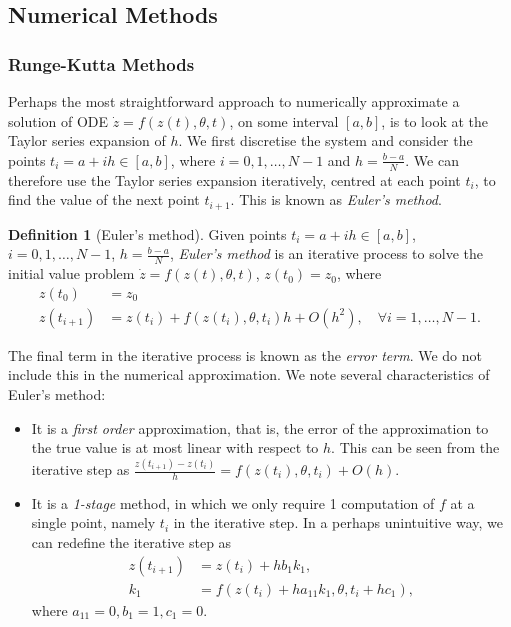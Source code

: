 \documentclass[a4paper,11pt,titlepage]{article}
\theoremstyle{definition}
\newtheorem{definition}{Definition}[section]
\theoremstyle{plain}
\theoremstyle{remark}
\begin{document}
\subsection{Numerical Methods}
\label{sec:nummethods}

\subsubsection{Runge-Kutta Methods}
\label{sec:rungekutta}

Perhaps the most straightforward approach to numerically approximate a solution of ODE $\dot{z}= f(z(t), \theta,t)$, on some interval $\left[a, b\right]$, is to look at the Taylor series expansion of $h$. We first discretise the system and consider the points $t_i = a + ih \in \left[a, b\right]$, where $i = 0, 1, \dots, N - 1$ and $h = \frac{b-a}{N}$. We can therefore use the Taylor series expansion iteratively, centred at each point $t_i$, to find the value of the next point $t_{i + 1}$. This is known as \textit{Euler's method}.

\begin{definition}[Euler's method]
    Given points $t_i = a + ih \in \left[a, b\right]$, $i = 0, 1, \dots, N - 1$, $h = \frac{b-a}{N}$, \textit{Euler's method} is an iterative process to solve the initial value problem $\dot{z}= f(z(t), \theta,t)$, $z(t_0) = z_0$, where
    \begin{align*}
        z(t_0) &= z_0 \\
        z(t_{i+1}) &= z(t_i) + f(z(t_{i}), \theta, t_i)h + O(h^2),\quad\forall i = 1, \dots, N - 1.
    \end{align*}
\end{definition}

The final term in the iterative process is known as the \textit{error term}. We do not include this in the numerical approximation. We note several characteristics of Euler's method:
\begin{itemize}
    \item It is a \textit{first order} approximation, that is, the error of the approximation to the true value is at most linear with respect to $h$. This can be seen from the iterative step as $\frac{z(t_{i+1}) - z(t_i)}{h} = f(z(t_i),\theta,t_i) + O(h)$.
    \item It is a \textit{1-stage} method, in which we only require 1 computation of $f$ at a single point, namely $t_i$ in the iterative step. In a perhaps unintuitive way, we can redefine the iterative step as 
    \begin{align*}
        z(t_{i+1}) &= z(t_i) + h b_1 k_1, \\
        k_1 &= f\left(z(t_i) + h a_{11}k_1, \theta, t_i + hc_1\right),
    \end{align*}
    where $a_{11} = 0, b_1 = 1, c_1 = 0$.
\end{itemize}
\end{document}

